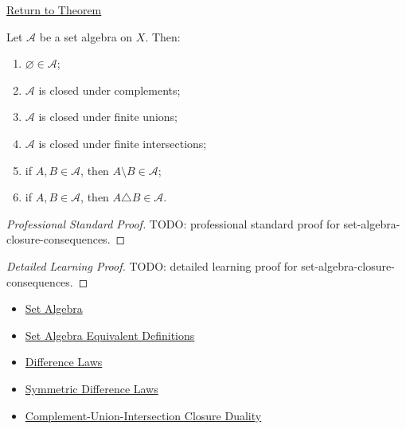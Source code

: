 \newpage
{}
\label{prf:set-algebra-closure-consequences}

\begin{remark*}[Return]
\hyperref[thm:set-algebra-closure-consequences]{Return to Theorem}
\end{remark*}

\begin{theorem*}
Let \(\mathcal A\) be a set algebra on \(X\).  Then:
\begin{enumerate}[label=(\roman*)]
\item \(\varnothing\in\mathcal A\);
\item \(\mathcal A\) is closed under complements;
\item \(\mathcal A\) is closed under finite unions;
\item \(\mathcal A\) is closed under finite intersections;
\item if \(A,B\in\mathcal A\), then \(A\setminus B\in\mathcal A\);
\item if \(A,B\in\mathcal A\), then \(A\triangle B\in\mathcal A\).
\end{enumerate}
\end{theorem*}

\begin{proof}[Professional Standard Proof]
\LRAProofBodyStart
TODO: professional standard proof for set-algebra-closure-consequences.
\end{proof}

\begin{proof}[Detailed Learning Proof]
\LRAProofBodyStart
TODO: detailed learning proof for set-algebra-closure-consequences.
\end{proof}

\begin{remark*}
\end{remark*}

\begin{dependencies}
\begin{itemize}
  \item \hyperref[def:set-algebra]{Set Algebra}
  \item \hyperref[thm:set-algebra-equivalent-definitions]{Set Algebra Equivalent Definitions}
  \item \hyperref[thm:difference-laws]{Difference Laws}
  \item \hyperref[thm:symmetric-difference-laws]{Symmetric Difference Laws}
  \item \hyperref[thm:complement-union-intersection-closure-duality]{Complement-Union-Intersection Closure Duality}
\end{itemize}
\end{dependencies}

\clearpage
